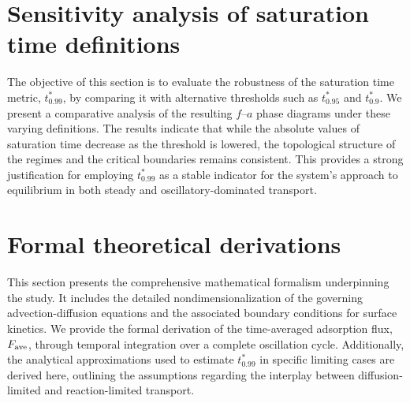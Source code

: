 \documentclass[lineno]{JFM-FLM_Au}
\begin{document}
\section{Sensitivity analysis of saturation time definitions}
\label{appdix-B}
The objective of this section is to evaluate the robustness of the saturation time metric, $t_{0.99}^*$, by comparing it with alternative thresholds such as $t_{0.95}^*$ and $t_{0.9}^*$. We present a comparative analysis of the resulting $f$--$a$ phase diagrams under these varying definitions. The results indicate that while the absolute values of saturation time decrease as the threshold is lowered, the topological structure of the regimes and the critical boundaries remains consistent. This provides a strong justification for employing $t_{0.99}^*$ as a stable indicator for the system’s approach to equilibrium in both steady and oscillatory-dominated transport.


\section{Formal theoretical derivations}
\label{appdix-D}
This section presents the comprehensive mathematical formalism underpinning the study. It includes the detailed nondimensionalization of the governing advection-diffusion equations and the associated boundary conditions for surface kinetics. We provide the formal derivation of the time-averaged adsorption flux, $F_{\rm ave}$, through temporal integration over a complete oscillation cycle. Additionally, the analytical approximations used to estimate $t_{0.99}^*$ in specific limiting cases are derived here, outlining the assumptions regarding the interplay between diffusion-limited and reaction-limited transport.



 

\end{document}
